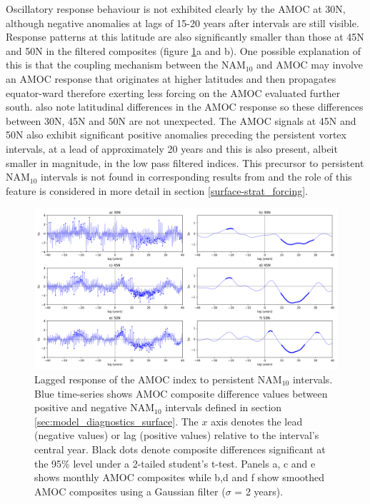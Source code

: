 Oscillatory response behaviour is not exhibited clearly by the AMOC at 30N, although negative anomalies at lags of 15-20 years after intervals are still visible. Response patterns at this latitude are also significantly smaller than those at 45N and 50N in the filtered composites (figure \ref{AMOC_comp_NAM}a and b). One possible explanation of this is that the coupling mechanism between the NAM$_{10}$ and AMOC may involve an AMOC response that originates at higher latitudes and then propagates equator-ward therefore exerting less forcing on the AMOC evaluated further south. \cite{zhangLatitudinal2010b} also note latitudinal differences in the AMOC response so these differences between 30N, 45N and 50N are not unexpected. The AMOC signals at 45N and 50N also exhibit significant positive anomalies preceding the persistent vortex intervals, at a lead of approximately 20 years and this is also present, albeit smaller in magnitude, in the low pass filtered indices. This precursor to persistent NAM$_{10}$ intervals is not found in corresponding results from \cite{reichlerStratospheric2012b} and the role of this feature is considered in more detail in section \ref{surface-strat_forcing}.

\begin{center}
\begin{figure}[h!]
\noindent\includegraphics[width = \linewidth]{Figures/Figures-surface/AMOC_responses_low_and_highf_combined.png} 
\caption{Lagged response of the AMOC index to persistent NAM$_{10}$ intervals. Blue time-series shows AMOC composite difference values between positive and negative NAM$_{10}$ intervals defined in section \ref{sec:model_diagnostics_surface}. The $x$ axis denotes the lead (negative values) or lag (positive values) relative to the interval's central year. Black dots denote composite differences significant at the 95\% level under a 2-tailed student's t-test. Panels a, c and e shows monthly AMOC composites while b,d and f show smoothed AMOC composites using a Gaussian filter ($\sigma$ = 2 years).}
\label{AMOC_comp_NAM}
\end{figure}
\end{center}

